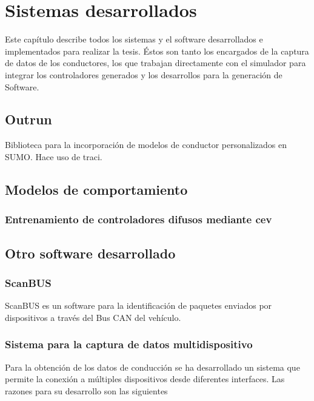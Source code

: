 \chapter{Sistemas desarrollados}
\label{ch:developed-software}

Este capítulo describe todos los sistemas y el software desarrollados e implementados para realizar la tesis. Éstos son tanto los encargados de la captura de datos de los conductores, los que trabajan directamente con el simulador para integrar los controladores generados y los desarrollos para la generación de Software.

\section{Outrun}

Biblioteca para la incorporación de modelos de conductor personalizados en SUMO. Hace uso de \gls{traci}.

\section{Modelos de comportamiento}

\subsection{Entrenamiento de controladores difusos mediante \gls{cev}}

\section{Otro software desarrollado}

\subsection{ScanBUS}

ScanBUS es un software para la identificación de paquetes enviados por dispositivos a través del Bus CAN del vehículo.

\subsection{Sistema para la captura de datos multidispositivo}

Para la obtención de los datos de conducción se ha desarrollado un sistema que permite la conexión a múltiples dispositivos desde diferentes interfaces. Las razones para su desarrollo son las siguientes


